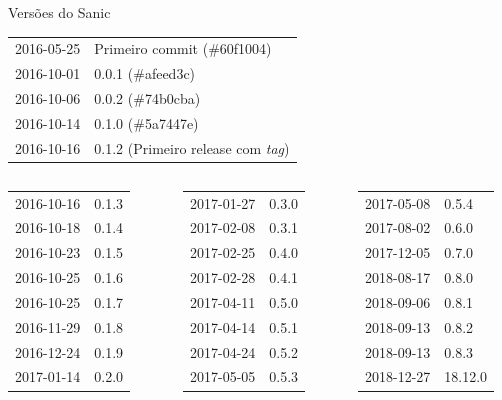 \documentclass[utf8]{beamer}
\begin{document}
\begin{frame}{Versões do Sanic}
  \begin{center}
    \begin{tabu}{cl}
      2016-05-25 & Primeiro commit (\#60f1004) \\
      2016-10-01 & 0.0.1 (\#afeed3c) \\
      2016-10-06 & 0.0.2 (\#74b0cba) \\
      2016-10-14 & 0.1.0 (\#5a7447e) \\
      2016-10-16 & 0.1.2 (Primeiro release com \emph{tag})\\
    \end{tabu}
    \vfill
    \begin{columns}[t]
      \begin{tabu}{cl}
        2016-10-16 & 0.1.3 \\
        2016-10-18 & 0.1.4 \\
        2016-10-23 & 0.1.5 \\
        2016-10-25 & 0.1.6 \\
        2016-10-25 & 0.1.7 \\
        2016-11-29 & 0.1.8 \\
        2016-12-24 & 0.1.9 \\
        2017-01-14 & 0.2.0 \\
      \end{tabu}
      \begin{tabu}{cl}
        2017-01-27 & 0.3.0 \\
        2017-02-08 & 0.3.1 \\
        2017-02-25 & 0.4.0 \\
        2017-02-28 & 0.4.1 \\
        2017-04-11 & 0.5.0 \\
        2017-04-14 & 0.5.1 \\
        2017-04-24 & 0.5.2 \\
        2017-05-05 & 0.5.3 \\
      \end{tabu}
      \begin{tabu}{cl}
        2017-05-08 & 0.5.4 \\
        2017-08-02 & 0.6.0 \\
        2017-12-05 & 0.7.0 \\
        2018-08-17 & 0.8.0 \\
        2018-09-06 & 0.8.1 \\
        2018-09-13 & 0.8.2 \\
        2018-09-13 & 0.8.3 \\
        2018-12-27 & 18.12.0 \\
      \end{tabu}
    \end{columns}
  \end{center}
\end{frame}
\end{document}
